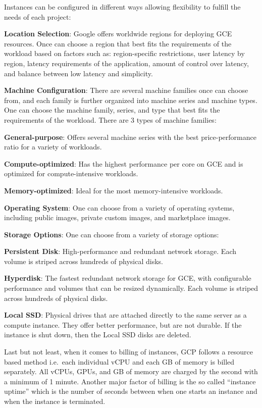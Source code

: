 Instances can be configured in different ways allowing flexibility to fulfill the needs of each project:
\bit
\item \textbf{Location Selection}: Google offers worldwide regions for deploying GCE resources. Once can choose a
region that best fits the requirements of the workload based on factors such as: region-specific restrictions, user
latency by region, latency requirements of the application, amount of control over latency, and balance between low
latency and simplicity.
\item \textbf{Machine Configuration}: There are several machine families once can choose from, and each family is
further organized into machine series and machine types. One can choose the machine family, series, and type that
best fits the requirements of the workload. There are 3 types of machine families:
\bit
\item \textbf{General-purpose}: Offers several machine series with the best price-performance ratio for a variety of
workloads.
\item \textbf{Compute-optimized}: Has the highest performance per core on GCE and is optimized for compute-intensive
workloads.
\item \textbf{Memory-optimized}: Ideal for the most memory-intensive workloads.
\eit
{}
\item \textbf{Operating System}: One can choose from a variety of operating systems, including public images, private
custom images, and marketplace images.
\item \textbf{Storage Options}: One can choose from a variety of storage options:
\bit
\item \textbf{Persistent Disk}: High-performance and redundant network storage. Each volume is striped across hundreds
of physical disks.
\item \textbf{Hyperdisk}: The fastest redundant network storage for GCE, with configurable performance and volumes that
can be resized dynamically. Each volume is striped across hundreds of physical disks.
\item \textbf{Local SSD}: Physical drives that are attached directly to the same server as a compute instance. They
offer better performance, but are not durable. If the instance is shut down, then the Local SSD disks are deleted.
\eit
\eit

Last but not least, when it comes to billing of instances, GCP follows a resource based method i.e.\ each individual
vCPU and each GB of memory is billed separately. All vCPUs, GPUs, and GB of memory are charged by the second with a
minimum of 1 minute. Another major factor of billing is the so called ``instance uptime'' which is the number of
seconds between when one starts an instance and when the instance is terminated.

